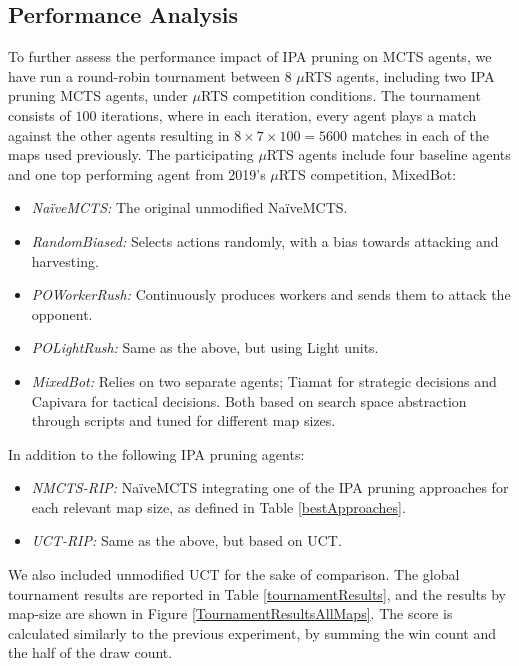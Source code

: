 \documentclass[conference]{IEEEtran}
\newcommand{\mRTS}{$\mu$RTS}
\begin{document}

\subsection{Performance Analysis}

To further assess the performance impact of IPA pruning on MCTS agents, we have run a round-robin tournament between $8$ \mRTS{} agents, including two IPA pruning MCTS agents, under \mRTS{} competition conditions. The tournament consists of $100$ iterations, where in each iteration, every agent plays a match against the other agents resulting in $8\times7\times100 = 5600$ matches in each of the maps used previously. The participating \mRTS{} agents include four baseline agents and one top performing agent from 2019's \mRTS{} competition, MixedBot: %

\begin{itemize}
\item \textit{NaïveMCTS:} The original unmodified NaïveMCTS.
\item \textit{RandomBiased:} Selects actions randomly, with a bias towards attacking and harvesting.
\item \textit{POWorkerRush:} Continuously produces workers and sends them to attack the opponent.
\item \textit{POLightRush:} Same as the above, but using Light units.
\item \textit{MixedBot:} Relies on two separate agents; Tiamat\cite{marino_evolving_2018} for strategic decisions and Capivara\cite{moraes_action_2018} for tactical decisions. Both based on search space abstraction through scripts and tuned for different map sizes.
\end{itemize}

In addition to the following IPA pruning agents:

\begin{itemize}
\item \textit{NMCTS-RIP:} NaïveMCTS integrating one of the IPA pruning approaches for each relevant map size, as defined in Table \ref{bestApproaches}.
\item \textit{UCT-RIP:} Same as the above, but based on UCT.
\end{itemize}

We also included unmodified UCT for the sake of comparison. The global tournament results are reported in Table \ref{tournamentResults}, and the results by map-size are shown in Figure \ref{TournamentResultsAllMaps}. The score is calculated similarly to the previous experiment, by summing the win count and the half of the draw count.
\end{document}
